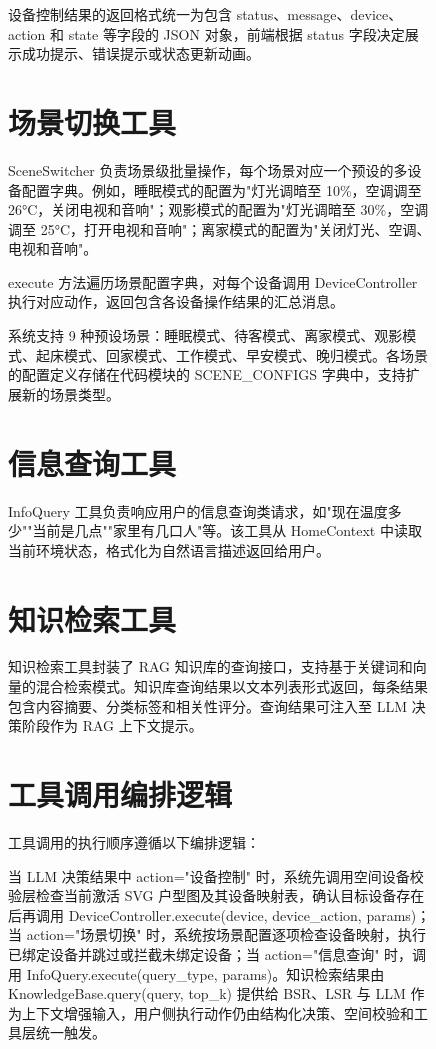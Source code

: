 \documentclass[12pt,a4paper,oneside]{ctexrep}
\begin{document}
\begin{figure}[H]
设备控制结果的返回格式统一为包含 status、message、device、action 和 state 等字段的 JSON 对象，前端根据 status 字段决定展示成功提示、错误提示或状态更新动画。

\section{场景切换工具}

SceneSwitcher 负责场景级批量操作，每个场景对应一个预设的多设备配置字典。例如，睡眠模式的配置为"灯光调暗至 10\%，空调调至 26°C，关闭电视和音响"；观影模式的配置为"灯光调暗至 30\%，空调调至 25°C，打开电视和音响"；离家模式的配置为"关闭灯光、空调、电视和音响"。

execute 方法遍历场景配置字典，对每个设备调用 DeviceController 执行对应动作，返回包含各设备操作结果的汇总消息。

系统支持 9 种预设场景：睡眠模式、待客模式、离家模式、观影模式、起床模式、回家模式、工作模式、早安模式、晚归模式。各场景的配置定义存储在代码模块的 SCENE\_CONFIGS 字典中，支持扩展新的场景类型。

\section{信息查询工具}

InfoQuery 工具负责响应用户的信息查询类请求，如"现在温度多少""当前是几点""家里有几口人"等。该工具从 HomeContext 中读取当前环境状态，格式化为自然语言描述返回给用户。

\section{知识检索工具}

知识检索工具封装了 RAG 知识库的查询接口，支持基于关键词和向量的混合检索模式。知识库查询结果以文本列表形式返回，每条结果包含内容摘要、分类标签和相关性评分。查询结果可注入至 LLM 决策阶段作为 RAG 上下文提示。

\section{工具调用编排逻辑}

工具调用的执行顺序遵循以下编排逻辑：

当 LLM 决策结果中 action="设备控制" 时，系统先调用空间设备校验层检查当前激活 SVG 户型图及其设备映射表，确认目标设备存在后再调用 DeviceController.execute(device, device\_action, params)；当 action="场景切换" 时，系统按场景配置逐项检查设备映射，执行已绑定设备并跳过或拦截未绑定设备；当 action="信息查询" 时，调用 InfoQuery.execute(query\_type, params)。知识检索结果由 KnowledgeBase.query(query, top\_k) 提供给 BSR、LSR 与 LLM 作为上下文增强输入，用户侧执行动作仍由结构化决策、空间校验和工具层统一触发。


\end{figure}
\end{document}

